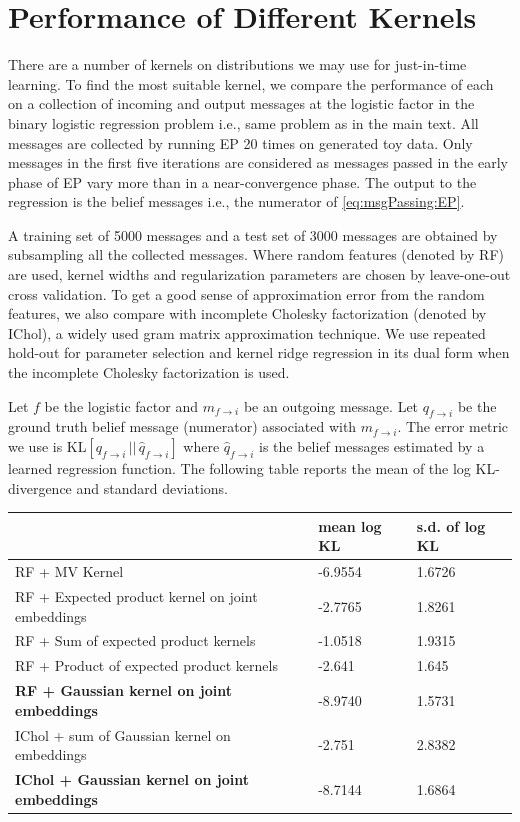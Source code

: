 \documentclass[english]{article}
\theoremstyle{plain}
\theoremstyle{plain}
\newcommand{\factor}{f}				%
\begin{document}
  

\section{Performance of Different Kernels
\label{sec:kernel_compare}
}

There are a number of kernels on distributions we may use for just-in-time learning.
To find the most suitable kernel, we compare the performance of each on a 
collection of incoming and output
messages at the logistic factor in the binary logistic regression problem i.e., 
same problem as in the main text.
All messages are collected by running EP 20 times on generated toy data. 
Only messages in the first five iterations are considered as messages passed in 
the early phase of EP vary more than in a near-convergence phase.
The output to the regression is the belief messages i.e., the numerator of \eqref{eq:msgPassing:EP}. 

A training set of 5000 messages and a test set of 3000 messages are obtained by 
subsampling all the collected messages. 
Where random features (denoted by RF) are used, kernel widths 
and regularization parameters are chosen by leave-one-out cross validation.
To get a good sense of approximation error from the random features, we also 
compare with incomplete Cholesky factorization (denoted by IChol), a widely used 
gram matrix approximation technique. We use repeated hold-out for parameter selection 
and kernel ridge regression in its dual form when the incomplete Cholesky 
factorization is used. 

Let $\factor$ be the logistic factor and $m_{\factor \rightarrow i}$ be an outgoing message. 
Let $q_{\factor \rightarrow i}$ be the ground truth belief message (numerator) associated with 
$m_{\factor\rightarrow i}$. The error metric we use is 
$\mathrm{KL}[q_{\factor \rightarrow i}\,||\, \hat{q}_{\factor \rightarrow i}]$
where  $\hat{q}_{\factor \rightarrow i}$ is the belief messages estimated by a learned 
regression function. The following table reports the mean of the log KL-divergence 
and standard deviations.

\begin{tabular}{|l|l|l|}
\hline
& \textbf{mean log KL} & \textbf{s.d. of log KL}  \\\hline
 RF + MV Kernel & -6.9554 & 1.6726 \\\hline
 {RF + Expected product kernel on joint embeddings} & -2.7765 & 1.8261  \\\hline
 {RF + Sum of expected product kernels} & -1.0518 & 1.9315  \\\hline
 {RF + Product of expected product kernels} & -2.641 & 1.645  \\\hline
 \textbf{RF + Gaussian kernel on joint embeddings} & -8.9740 & 1.5731  \\\hline
 {IChol + sum of Gaussian kernel on embeddings} & -2.751 & 2.8382  \\\hline
 \textbf{IChol + Gaussian kernel on joint embeddings} & -8.7144 & 1.6864  \\\hline
\end{tabular}
\end{document}
